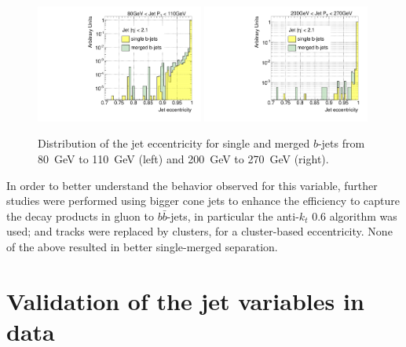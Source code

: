 
\begin{figure}[tp]
\centering
\includegraphics[width=0.49\textwidth]{FIGS/VarsSingleMerged/JetEcc080.pdf}
\includegraphics[width=0.49\textwidth]{FIGS/VarsSingleMerged/JetEcc200.pdf}
\caption{Distribution of the jet eccentricity for single and merged $b$-jets from 80~GeV to 110~GeV (left) and 200~GeV to 270~GeV (right).}
\label{fig:jeteccsinglemerged}
\end{figure}


In order to better understand the behavior observed for this variable, further studies were performed using bigger cone jets to enhance the efficiency to capture the decay products in gluon to $b \bar{b}$-jets, in particular the anti-$k_t$ 0.6 algorithm was used; and %
tracks were replaced by clusters, for a cluster-based eccentricity.  None of the above resulted in better single-merged separation.






\section{Validation of the jet variables in data}\label{sec:gbbValidation}

